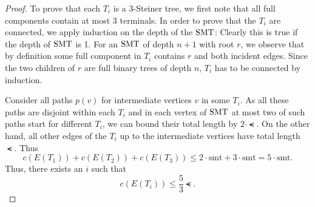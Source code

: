 \documentclass[../skript.tex]{subfiles}
\begin{document}
\begin{proof}
To prove that each $T_i$ is a 3-Steiner tree, we first note that all full components contain at most $3$ terminals.
In order to prove that the $T_i$ are connected, we apply induction on the depth of the $\operatorname{SMT}$: Clearly this is true if the depth of $\operatorname{SMT}$ is 1. For an $\operatorname{SMT}$ of depth $n + 1$ with root $r$, we observe that by definition some full component in $T_i$ contains $r$ and both incident edges. Since the two children of $r$ are full binary trees of depth  $n$, $T_i$ has to be connected by induction.

Consider all paths $p(v)$ for intermediate vertices $v$ in some $T_i$. As all these paths are disjoint within each $T_i$ and in each vertex of $\operatorname{SMT}$ at most two of such paths start for different $T_i$, we can bound their total length by $2 \cdot \smt$.
On the other hand, all other edges of the $T_i$ up to the intermediate vertices have total length $\smt$. Thus
\[
	c(E(T_1)) + c(E(T_2)) + c(E(T_3)) \leq 2 \cdot \mathrm{smt} + 3 \cdot \mathrm{smt} = 5 \cdot \mathrm{smt}.
\]
Thus, there exists an $i$ such that
\[
	c(E(T_i)) \leq \frac{5}{3} \smt.
\]
\end{proof}
\end{document}
